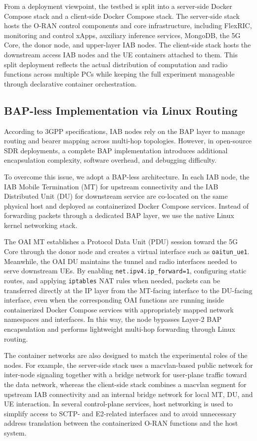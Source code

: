 \documentclass[conference, a4paper]{IEEEtran}
\begin{document}
From a deployment viewpoint, the testbed is split into a server-side Docker Compose stack and a client-side Docker Compose stack. The server-side stack hosts the O-RAN control components and core infrastructure, including FlexRIC, monitoring and control xApps, auxiliary inference services, MongoDB, the 5G Core, the donor node, and upper-layer IAB nodes. The client-side stack hosts the downstream access IAB nodes and the UE containers attached to them. This split deployment reflects the actual distribution of computation and radio functions across multiple PCs while keeping the full experiment manageable through declarative container orchestration.

\subsection{BAP-less Implementation via Linux Routing}
According to 3GPP specifications, IAB nodes rely on the BAP layer to manage routing and bearer mapping across multi-hop topologies. However, in open-source SDR deployments, a complete BAP implementation introduces additional encapsulation complexity, software overhead, and debugging difficulty.

To overcome this issue, we adopt a BAP-less architecture. In each IAB node, the IAB Mobile Termination (MT) for upstream connectivity and the IAB Distributed Unit (DU) for downstream service are co-located on the same physical host and deployed as containerized Docker Compose services. Instead of forwarding packets through a dedicated BAP layer, we use the native Linux kernel networking stack.

The OAI MT establishes a Protocol Data Unit (PDU) session toward the 5G Core through the donor node and creates a virtual interface such as \texttt{oaitun\_ue1}. Meanwhile, the OAI DU maintains the tunnel and radio interfaces needed to serve downstream UEs. By enabling \texttt{net.ipv4.ip\_forward=1}, configuring static routes, and applying \texttt{iptables} NAT rules when needed, packets can be transferred directly at the IP layer from the MT-facing interface to the DU-facing interface, even when the corresponding OAI functions are running inside containerized Docker Compose services with appropriately mapped network namespaces and interfaces. In this way, the node bypasses Layer-2 BAP encapsulation and performs lightweight multi-hop forwarding through Linux routing.

The container networks are also designed to match the experimental roles of the nodes. For example, the server-side stack uses a macvlan-based public network for inter-node signaling together with a bridge network for user-plane traffic toward the data network, whereas the client-side stack combines a macvlan segment for upstream IAB connectivity and an internal bridge network for local MT, DU, and UE interaction. In several control-plane services, host networking is used to simplify access to SCTP- and E2-related interfaces and to avoid unnecessary address translation between the containerized O-RAN functions and the host system.
\end{document}
